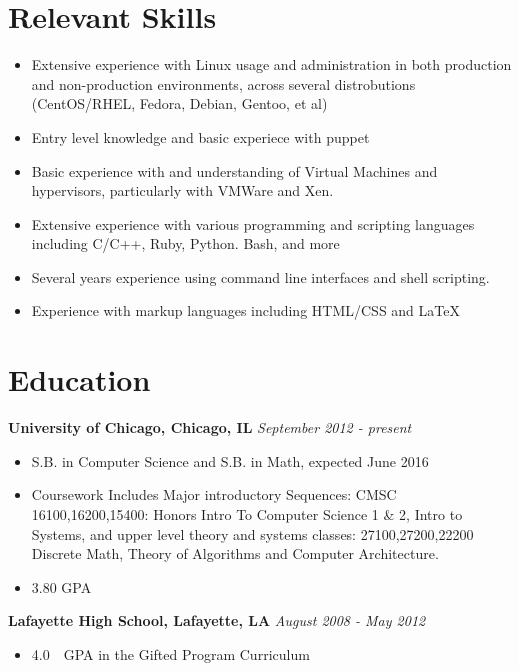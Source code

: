 \documentclass[11pt,letterpaper]{article} %
\begin{document}
    \section*{Relevant Skills} 
        \begin{itemize}
        \item Extensive experience with Linux usage and administration in both production and non-production environments,  across several distrobutions (CentOS/RHEL, Fedora, Debian, Gentoo, et al)  
        \item Entry level knowledge and basic experiece with puppet 
        \item Basic experience with and understanding of Virtual Machines and hypervisors, particularly with  VMWare and Xen. 
        \item Extensive experience with various programming and scripting languages including C/C++, Ruby, Python. Bash, and more
        \item Several years experience using command line interfaces and shell scripting. 
        \item Experience with markup languages including HTML/CSS and \LaTeX
        \end{itemize}          
    \section*{Education}
        \textbf{University of Chicago, Chicago, IL } \hfill \textit{ September 2012 - present } 
        \begin{itemize} 
            \item S.B. in Computer Science and S.B. in Math, expected June 2016 
            \item Coursework Includes Major introductory Sequences: CMSC 16100,16200,15400: 
                Honors Intro To Computer Science 1 \& 2, Intro to Systems, and upper level theory and systems classes: 27100,27200,22200
                Discrete Math, Theory of Algorithms and Computer Architecture. 
            \item 3.80 GPA
        \end{itemize}
        \textbf{ Lafayette High School, Lafayette, LA } \hfill \textit{August 2008 - May 2012 }  
        \begin{itemize} 
            \item 4.0\ \  GPA in the  Gifted Program Curriculum
            \end{itemize}
    \vfill
    \centerline{ }
\end{document}
